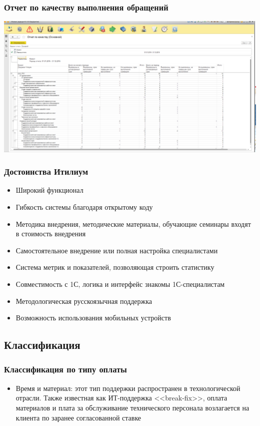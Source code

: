 \documentclass{../industrial-development}
\begin{document}
\begin{frame} \frametitle{Отчет по качеству выполнения обращений}
\centerline{\includegraphics[width=\textwidth]{pic13.png}}
\end{frame}
\lecturenotes

\begin{frame} \frametitle{Достоинства Итилиум}
	\begin{itemize}
		\item Широкий функционал
		\item Гибкость системы благодаря открытому коду
		\item Методика внедрения, методические материалы, обучающие семинары входят в стоимость внедрения
		\item Самостоятельное внедрение или полная настройка специалистами 
		\item Система метрик и показателей, позволяющая строить статистику
		\item Совместимость с 1С, логика и интерфейс знакомы 1С-специалистам
		\item Методологическая русскоязычная поддержка
		\item Возможность использования мобильных устройств
	\end{itemize}
\end{frame}
\lecturenotes


\subsection{Классификация}
\begin{frame} \frametitle{Классификация по типу оплаты}
	\begin{itemize} 
		\item {Время и материал}: этот тип поддержки распространен в технологической отрасли. Также известная как ИТ-поддержка <<break-fix>>, оплата материалов и плата за обслуживание технического персонала возлагается на клиента по заранее согласованной ставке
	\end{itemize}
\end{frame}
\end{document}
